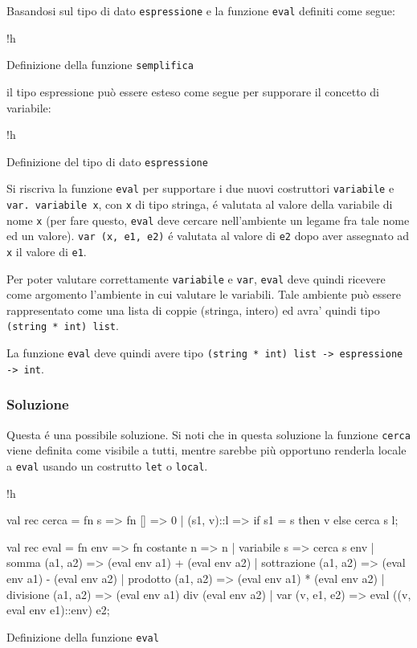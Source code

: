 Basandosi sul tipo di dato \texttt{espressione} e la funzione \texttt{eval} definiti come segue:

\begin{listing}{!h}
\caption{Definizione della funzione \texttt{semplifica}}
\end{listing}

il tipo espressione può essere esteso come segue per supporare il concetto di variabile:

\begin{listing}{!h}
\caption{Definizione del tipo di dato \texttt{espressione}}
\end{listing}

Si riscriva la funzione \texttt{eval} per supportare i due nuovi costruttori \texttt{variabile} e \texttt{var. variabile x}, con \texttt{x} di tipo stringa, é valutata al valore della variabile di nome \texttt{x} (per fare questo, \texttt{eval} deve cercare nell'ambiente un legame fra tale nome ed un valore). %
\texttt{var (x, e1, e2)} é valutata al valore di \texttt{e2} dopo aver assegnato ad \texttt{x} il valore di \texttt{e1}.

\medskip
Per poter valutare correttamente \texttt{variabile} e \texttt{var}, \texttt{eval} deve quindi ricevere come argomento l'ambiente in cui valutare le variabili. %
Tale ambiente può essere rappresentato come una lista di coppie (stringa, intero) ed avra' quindi tipo \texttt{(string * int) list}.

\medskip
La funzione \texttt{eval} deve quindi avere tipo \texttt{(string * int) list -> espressione -> int}.

\subsubsection{Soluzione}

Questa é una possibile soluzione. %
Si noti che in questa soluzione la funzione \texttt{cerca} viene definita come visibile a tutti, mentre sarebbe più opportuno renderla locale a \texttt{eval} usando un costrutto \texttt{let} o \texttt{local}.

\begin{listing}{!h}
\begin{smlcode}
val rec cerca = fn s => fn [] => 0
						 | (s1, v)::l => if s1 = s then v else cerca s l;

val rec eval = fn env =>
			   fn costante    n           => n
				| variabile   s           => cerca s env
				| somma       (a1, a2)    => (eval env a1) +   (eval env a2)
				| sottrazione (a1, a2)    => (eval env a1) -   (eval env a2)
				| prodotto    (a1, a2)    => (eval env a1) *   (eval env a2)
				| divisione   (a1, a2)    => (eval env a1) div (eval env a2)
				| var (v, e1, e2) => eval ((v, eval env e1)::env) e2;
\end{smlcode}
\caption[]{Definizione della funzione \texttt{eval}}
\end{listing}

